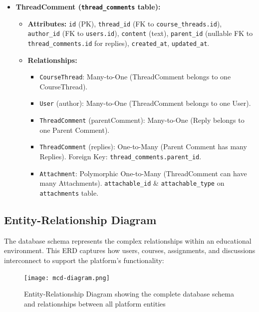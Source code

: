 \documentclass[12pt,a4paper]{article}
\begin{document}
\begin{itemize}
\begin{itemize}
\begin{itemize}
        \end{itemize}
    \end{itemize}
    \item \textbf{ThreadComment (\texttt{thread\_comments} table):}
    \begin{itemize}
        \item \textbf{Attributes:} \texttt{id} (PK), \texttt{thread\_id} (FK to \texttt{course\_threads.id}), \texttt{author\_id} (FK to \texttt{users.id}), \texttt{content} (text), \texttt{parent\_id} (nullable FK to \texttt{thread\_comments.id} for replies), \texttt{created\_at}, \texttt{updated\_at}.
        \item \textbf{Relationships:}
        \begin{itemize}
            \item \texttt{CourseThread}: Many-to-One (ThreadComment belongs to one CourseThread).
            \item \texttt{User} (author): Many-to-One (ThreadComment belongs to one User).
            \item \texttt{ThreadComment} (parentComment): Many-to-One (Reply belongs to one Parent Comment).
            \item \texttt{ThreadComment} (replies): One-to-Many (Parent Comment has many Replies). Foreign Key: \texttt{thread\_comments.parent\_id}.
            \item \texttt{Attachment}: Polymorphic One-to-Many (ThreadComment can have many Attachments). \texttt{attachable\_id} \& \texttt{attachable\_type} on \texttt{attachments} table.
        \end{itemize}
    \end{itemize}
\end{itemize}

\subsection{Entity-Relationship Diagram}
The database schema represents the complex relationships within an educational environment. This ERD captures how users, courses, assignments, and discussions interconnect to support the platform's functionality:

\begin{figure}[H] %
    \centering
    \texttt{[image: mcd-diagram.png]}
    \caption{Entity-Relationship Diagram showing the complete database schema and relationships between all platform entities}
    \label{fig:er-diagram}
\end{figure}
\FloatBarrier %
\clearpage
\end{document}
